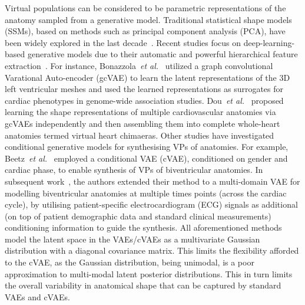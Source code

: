 \documentclass[runningheads]{llncs}
\begin{document}
Virtual populations can be considered to be parametric representations of the anatomy sampled from a generative model. Traditional statistical shape models (SSMs), based on methods such as principal component analysis (PCA), have been widely explored in the last decade~\cite{ravikumar2018group,gooya2015bayesian,frangi2002automatic}. Recent studies focus on deep-learning-based generative models due to their automatic and powerful hierarchical feature extraction~\cite{bonazzola2021image,dou2022generative}. For instance, Bonazzola~\textit{et al.}~\cite{bonazzola2021image} utilized a graph convolutional Varational Auto-encoder (gcVAE) to learn the latent representations of the 3D left ventricular meshes and used the learned representations as surrogates for cardiac phenotypes in genome-wide association studies. Dou~\textit{et al.}~\cite{dou2022generative} proposed learning the shape representations of multiple cardiovascular anatomies via gcVAEs independently and then assembling them into complete whole-heart anatomies termed virtual heart chimaeras. Other studies have investigated conditional generative models for synthesising VPs of anatomies. For example, Beetz~\textit{et al.}~\cite{beetz2022generating} employed a conditional VAE (cVAE), conditioned on gender and cardiac phase, to enable synthesis of VPs of biventricular anatomies. In subsequent work~\cite{li2023deep,beetz2022multi}, the authors extended their method to a multi-domain VAE for modelling biventricular anatomies at multiple times points (across the cardiac cycle), by utilising patient-specific electrocardiogram (ECG) signals as additional (on top of patient demographic data and standard clinical measurements) conditioning information to guide the synthesis. %
All aforementioned methods model the latent space in the VAEs/cVAEs as a multivariate Gaussian distribution with a diagonal covariance matrix. This limits the flexibility afforded to the cVAE, as the Gaussian distribution, being unimodal, is a poor approximation to multi-modal latent posterior distributions. This in turn limits the overall variability in anatomical shape that can be captured by standard VAEs and cVAEs. %
\end{document}
